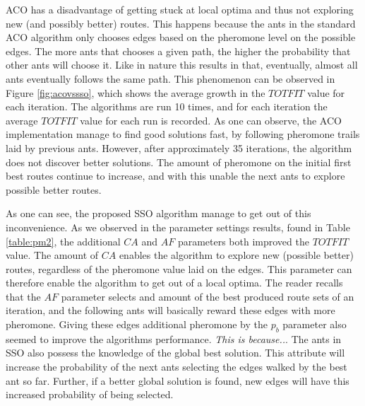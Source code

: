 ACO has a disadvantage of getting stuck at local optima and thus not exploring new (and possibly better) routes. This happens because the ants in the standard ACO algorithm only chooses edges based on the pheromone level on the possible edges. The more ants that chooses a given path, the higher the probability that other ants will choose it. Like in nature this results in that, eventually, almost all ants eventually follows the same path. This phenomenon can be observed in Figure \vref{fig:acovssso}, which shows the average growth in the $TOTFIT$ value for each iteration. The algorithms are run 10 times, and for each iteration the average $TOTFIT$ value for each run is recorded. As one can observe, the ACO implementation manage to find good solutions fast, by following pheromone trails laid by previous ants. However, after approximately 35 iterations, the algorithm does not discover better solutions. The amount of pheromone on the initial first best routes continue to increase, and with this unable the next ants to explore possible better routes. 

As one can see, the proposed SSO algorithm manage to get out of this inconvenience. As we observed in the parameter settings results, found in Table \vref{table:pm2}, the additional $CA$ and $AF$ parameters both improved the $TOTFIT$ value. The amount of $CA$ enables the algorithm to explore new (possible better) routes, regardless of the pheromone value laid on the edges. This parameter can therefore enable the algorithm to get out of a local optima. The reader recalls that the $AF$ parameter selects and amount of the best produced route sets of an iteration, and the following ants will basically reward these edges with more pheromone. Giving these edges additional pheromone by the $p_b$ parameter also seemed to improve the algorithms performance. \emph{\color{blue}This is because..}. The ants in SSO also possess the knowledge of the global best solution. This attribute will increase the probability of the next ants selecting the edges walked by the best ant so far. Further, if a better global solution is found, new edges will have this increased probability of being selected.


